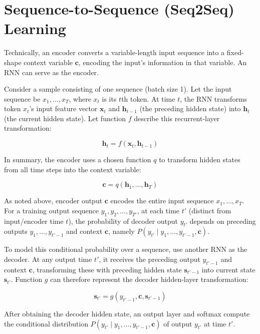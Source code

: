 \setcounter{section}{7}

\hypertarget{sequence-to-sequence-seq2seq-learning}{%
\section{Sequence-to-Sequence (Seq2Seq) Learning}\label{sequence-to-sequence-seq2seq-learning}}

Technically, an encoder converts a variable-length input sequence into a fixed-shape context variable \(\mathbf{c}\), encoding the input's information in that variable. An RNN can serve as the encoder.

Consider a sample consisting of one sequence (batch size 1). Let the input sequence be \(x_1,\ldots,x_T\), where \(x_t\) is its \(t\)th token. At time \(t\), the RNN transforms token \(x_t\)'s input feature vector \(\mathbf{x}_t\) and \(\mathbf{h}_{t-1}\) (the preceding hidden state) into \(\mathbf{h}_t\) (the current hidden state). Let function \(f\) describe this recurrent-layer transformation:

\[
\mathbf{h}_t = f(\mathbf{x}_t,\mathbf{h}_{t-1})
\]

In summary, the encoder uses a chosen function \(q\) to transform hidden states from all time steps into the context variable:

\[
\mathbf{c} = q(\mathbf{h}_1,\ldots,\mathbf{h}_T)
\]

As noted above, encoder output \(\mathbf{c}\) encodes the entire input sequence \(x_1,\ldots,x_T\). For a training output sequence \(y_1,y_2,\ldots,y_{T'}\), at each time \(t'\) (distinct from input/encoder time \(t\)), the probability of decoder output \(y_{t'}\) depends on preceding outputs \(y_1,\ldots,y_{t'-1}\) and context \(\mathbf{c}\), namely \(P(y_{t'} \mid y_1,\ldots,y_{t'-1},\mathbf{c})\).

To model this conditional probability over a sequence, use another RNN as the decoder. At any output time \(t'\), it receives the preceding output \(y_{t'-1}\) and context \(\mathbf{c}\), transforming these with preceding hidden state \(\mathbf{s}_{t'-1}\) into current state \(\mathbf{s}_{t'}\). Function \(g\) can therefore represent the decoder hidden-layer transformation:

\[
\mathbf{s}_{t'} = g(y_{t'-1},\mathbf{c},\mathbf{s}_{t'-1})
\]

After obtaining the decoder hidden state, an output layer and softmax compute the conditional distribution \(P(y_{t'} \mid y_1,\ldots,y_{t'-1},\mathbf{c})\) of output \(y_{t'}\) at time \(t'\).

